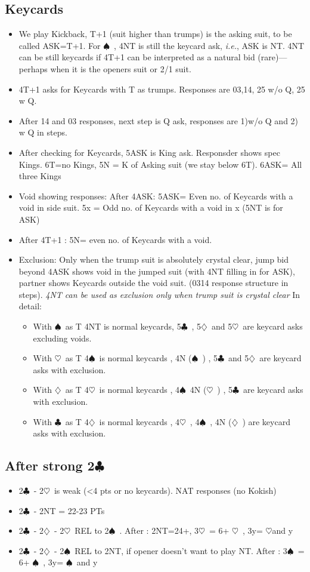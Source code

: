\documentclass{article}
\newcommand\C{\ensuremath{\clubsuit}}
\newcommand\D{\ensuremath{\diamondsuit}}
\renewcommand\H{\ensuremath{\heartsuit}}
\renewcommand\S{\ensuremath{\spadesuit}}
\begin{document}
\begin{multicols}{2}
  \subsection{Keycards}
  \label{kickback}
  \begin{itemize}
\item We play Kickback, T+1 (suit higher than trumps) is the asking suit, to be called ASK=T+1. For \S\ , 4NT is still the keycard ask, \textit{i.e.},  ASK is NT. 4NT can be still keycards if 4T+1 can be interpreted as a natural bid (rare)--- perhaps when it is the openers suit or 2/1 suit.
\item   4T+1 asks for Keycards with T as trumps. Responses are 03,14, 25 w/o Q, 25 w Q.
 \item After 14 and 03 responses, next step is Q ask, responses are 1)w/o Q and 2) w Q in steps.
 \item After checking for Keycards, 5ASK is King ask. Responsder shows spec Kings. 6T=no Kings, 5N = K of Asking suit (we stay below 6T). 6ASK= All three Kings
 \item Void showing responses: After 4ASK: 5ASK= Even no. of Keycards with a void in side suit. 5x = Odd no. of Keycards with a void in x (5NT is for ASK)
 \item After 4T+1 : 5N= even no. of Keycards with a void.
 \item Exclusion: Only when the trump suit is absolutely crystal clear, jump bid beyond 4ASK shows void in the jumped suit (with 4NT filling in for ASK), partner shows Keycards outside the void suit. (0314 response structure in steps). \emph{4NT can be used as exclusion only when trump suit is crystal clear}
   In detail: 
   \begin{itemize}
     \item With  \S\ as T 4NT is normal keycards, 5\C\ , 5\D\ and 5\H\ are keycard asks excluding voids.
     \item With \H\ as T 4\S\ is normal keycards , 4N (\S\ ) , 5\C\ and 5\D\ are keycard asks with exclusion.
     \item With \D\ as T 4\H\ is normal keycards , 4\S\ 4N (\H\ ) , 5\C\   are keycard asks with exclusion.
     \item With \C\ as T 4\D\ is normal keycards , 4\H\ , 4\S\ ,  4N (\D\ )    are keycard asks with exclusion.
     \end{itemize}
 \end{itemize}


 \subsection{After strong 2\C\ }
 \label{kokish}
 \begin{itemize}
   \item 2\C\ - 2\H\ is weak (<4 pts or no keycards). NAT responses (no Kokish)
   \item 2\C\ - 2NT = 22-23 PTs
   \item 2\C\ - 2\D\ - 2\H\ REL to 2\S\ .  After : 2NT=24+, 3\H\ = 6+ \H\ , 3y= \H and y
   \item 2\C\ - 2\D\ - 2\S\ REL to 2NT, if opener doesn't want to play NT. After :  3\S\ = 6+ \S\ , 3y= \S\ and y
   \end{itemize}

\end{multicols}
\end{document}

